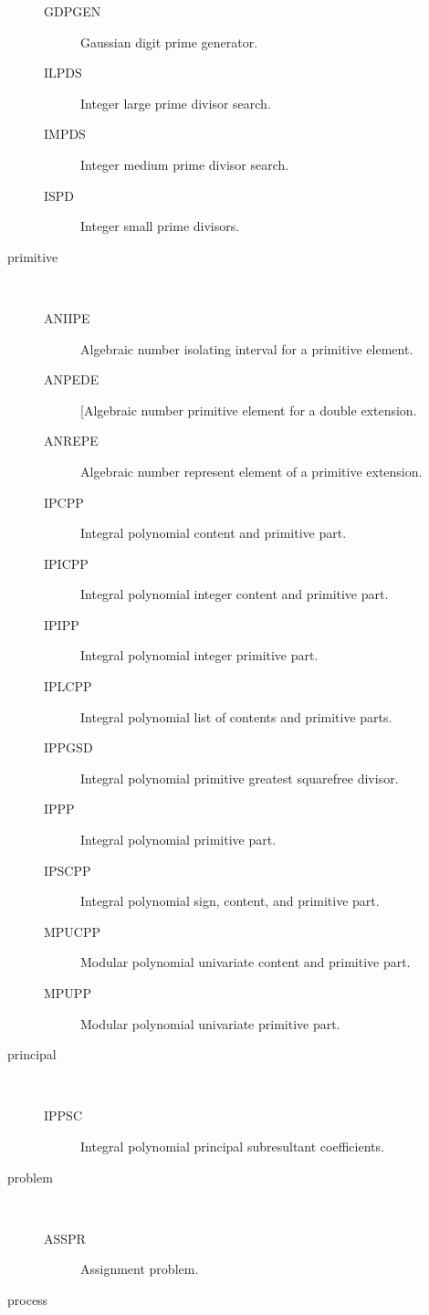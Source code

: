 \begin{description}
\begin{description}
  \item[GDPGEN]  Gaussian digit prime generator.
  \item[ILPDS]  Integer large prime divisor search.
  \item[IMPDS]  Integer medium prime divisor search.
  \item[ISPD]  Integer small prime divisors.
  \end{description}
\item[primitive] \ \ 
  \begin{description}
  \item[ANIIPE]  Algebraic number isolating interval for a primitive element.
  \item[ANPEDE]  [Algebraic number primitive element for a double extension.
  \item[ANREPE]  Algebraic number represent element of a primitive extension.
  \item[IPCPP]  Integral polynomial content and primitive part.
  \item[IPICPP]  Integral polynomial integer content and primitive part.
  \item[IPIPP]  Integral polynomial integer primitive part.
  \item[IPLCPP]  Integral polynomial list of contents and primitive parts.
  \item[IPPGSD]  Integral polynomial primitive greatest squarefree divisor.
  \item[IPPP]  Integral polynomial primitive part.
  \item[IPSCPP]  Integral polynomial sign, content, and primitive part.
  \item[MPUCPP]  Modular polynomial univariate content and primitive part.
  \item[MPUPP]  Modular polynomial univariate primitive part.
  \end{description}
\item[principal] \ \ 
  \begin{description}
  \item[IPPSC]  Integral polynomial principal subresultant coefficients.
  \end{description}
\item[problem] \ \ 
  \begin{description}
  \item[ASSPR]  Assignment problem.
  \end{description}
\item[process] \ \ 
  \begin{description}

\end{description}
\end{description}
